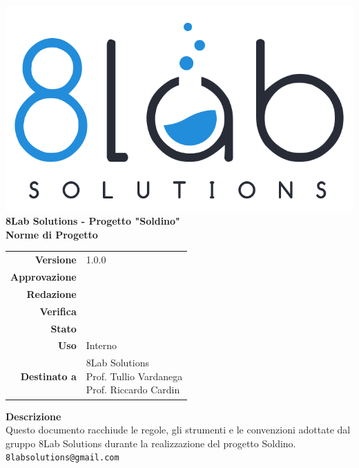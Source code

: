 \thispagestyle{empty}
\begin{titlepage}
	\begin{center}
		\includegraphics[scale = 0.3]{res/images/logo8_crop.png}\\
		\large \textbf{8Lab Solutions - Progetto "Soldino"} \\
		\vfill
		\Huge \textbf{Norme di Progetto}
		\vspace*{\fill} 
        \vfill
        \large
        \begin{tabular}{r|l}
                        \textbf{Versione} & 1.0.0\\
                        \textbf{Approvazione} &\\
                        \textbf{Redazione} &\\
                        \textbf{Verifica} &\\
                        \textbf{Stato} &\\
                        \textbf{Uso} & Interno\\
                        \textbf{Destinato a} & \parbox[t]{5cm}{8Lab Solutions\\Prof. Tullio Vardanega\\Prof. Riccardo Cardin}
                \end{tabular}
                \vfill
                \normalsize
                \textbf{Descrizione}\\
                Questo documento racchiude le regole, gli strumenti e le convenzioni adottate dal gruppo 8Lab Solutions durante la realizzazione del progetto Soldino.\\
                \vfill
                \small
                \texttt{8labsolutions@gmail.com}
	\end{center}
\end{titlepage}